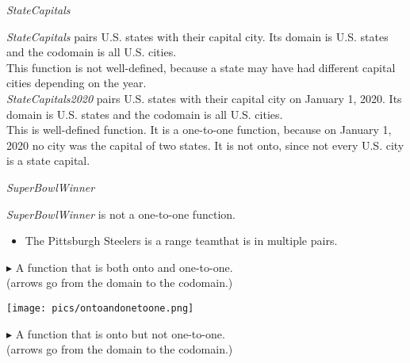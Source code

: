 \documentclass{ximera}
\begin{document}
\begin{example} \textit{StateCapitals}


\textit{StateCapitals} pairs U.S. states with their capital city. Its domain is U.S. states and the codomain is all U.S. cities.\\



This function is not well-defined, because a state may have had different capital cities depending on the year. \\


\textit{StateCapitals2020} pairs U.S. states with their capital city on January 1, 2020. Its domain is U.S. states and the codomain is all U.S. cities.\\


This is well-defined function.  It is a one-to-one function, because on January 1, 2020 no city was the capital of two states.  It is not onto, since not every U.S. city is a state capital.


\end{example}











\begin{example} \textit{SuperBowlWinner}


\textit{SuperBowlWinner} is not a one-to-one function.


\begin{itemize}
\item The Pittsburgh Steelers is a range teamthat is in multiple pairs. 
\end{itemize}

\end{example}









$\blacktriangleright$ A function that is both onto and one-to-one.  \\
(arrows go from the domain to the codomain.)

\begin{image}
\texttt{[image: pics/ontoandonetoone.png]}
\end{image}






$\blacktriangleright$ A function that is onto but not one-to-one.  \\
(arrows go from the domain to the codomain.)
\end{document}
